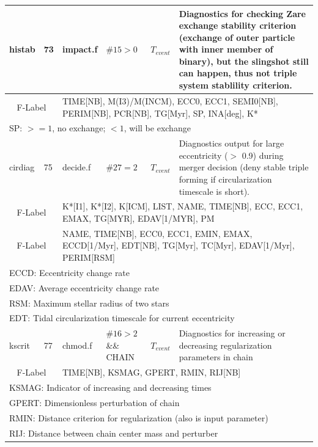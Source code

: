 \begin{longtable}{||p{0.42in}|p{0.25in}|p{0.6in}|p{0.6in}|p{0.4in}|p{2.3in}||}
 histab     & 73  & impact.f   &  $\#15>0$   & $T_{event}$    & Diagnostics for checking Zare exchange stability criterion (exchange of outer particle with inner member of binary), but the slingshot still can happen, thus not triple system stablility criterion. \\\hline
\multicolumn{2}{|c|}{ F-Label } & \multicolumn{4}{|p{4.4in}|}{ TIME[NB], M(I3)/M(INCM), ECC0, ECC1, SEMI0[NB], PERIM[NB], PCR[NB], TG[Myr], SP, INA[deg], K* }\\\hline
\multicolumn{6}{|p{5.4in}|}{ SP: $>=1$, no exchange; $<1$, will be exchange }\\
\hline\hline

 cirdiag     & 75  & decide.f   & $\#27=2$   & $T_{event}$    & Diagnostics output for large eccentricity ($>$ 0.9) during merger decision (deny stable triple forming if circularization timescale is short). \\\hline
 \multicolumn{2}{|c|}{ F-Label } & \multicolumn{4}{|p{4.4in}|}{ K*[I1], K*[I2], K[ICM], LIST, NAME, TIME[NB], ECC, ECC1, EMAX, TG[MYR], EDAV[1/MYR], PM}\\\hline
\multicolumn{2}{|c|}{ F-Label } & \multicolumn{4}{|p{4.4in}|}{ NAME, TIME[NB], ECC0, ECC1, EMIN, EMAX, ECCD[1/Myr], EDT[NB], TG[Myr], TC[Myr], EDAV[1/Myr], PERIM[RSM] }\\\hline
\multicolumn{6}{|p{5.4in}|}{ ECCD: Eccentricity change rate }\\
\multicolumn{6}{|p{5.4in}|}{ EDAV: Average eccentricity change rate }\\
\multicolumn{6}{|p{5.4in}|}{ RSM: Maximum stellar radius of two stars }\\
\multicolumn{6}{|p{5.4in}|}{ EDT: Tidal circularization timescale for current eccentricity }\\
\hline\hline

 kscrit     & 77  & chmod.f    & $\#16>2$ \&\& CHAIN & $T_{event}$ & Diagnostics for increasing or decreasing regularization parameters in chain \\\hline
\multicolumn{2}{|c|}{ F-Label } & \multicolumn{4}{|p{4.4in}|}{ TIME[NB], KSMAG, GPERT, RMIN, RIJ[NB]} \\\hline
\multicolumn{6}{|p{5.4in}|}{ KSMAG: Indicator of increasing and decreasing times  }\\
\multicolumn{6}{|p{5.4in}|}{ GPERT: Dimensionless perturbation of chain }\\
\multicolumn{6}{|p{5.4in}|}{ RMIN: Distance criterion for regularization (also is input parameter)} \\
\multicolumn{6}{|p{5.4in}|}{ RIJ: Distance between chain center mass and perturber}\\ 
\hline\hline


\end{longtable}
